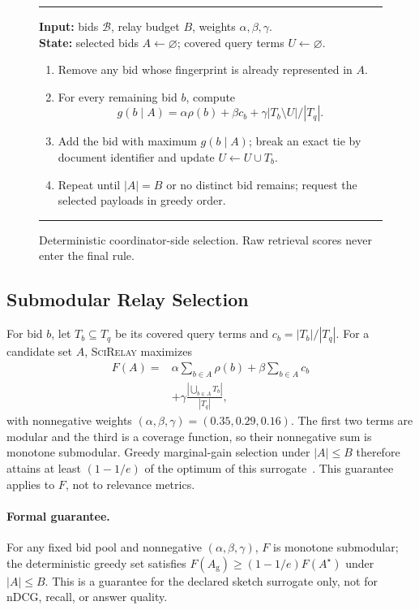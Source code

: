 \documentclass[sigconf]{acmart}
\newcommand{\method}{\textsc{SciRelay}}
\begin{document}
\begin{figure}[t]
  \small
  \hrule
  \vspace{3pt}
  \textbf{Input:} bids $\mathcal{B}$, relay budget $B$, weights $\alpha,\beta,\gamma$.\\
  \textbf{State:} selected bids $A\leftarrow\varnothing$; covered query terms $U\leftarrow\varnothing$.
  \begin{enumerate}
    \setlength{\itemsep}{0pt}
    \setlength{\parskip}{0pt}
    \item Remove any bid whose fingerprint is already represented in $A$.
    \item For every remaining bid $b$, compute
    \[
      g(b\mid A)=\alpha\rho(b)+\beta c_b+
      \gamma |T_b\setminus U|/|T_q|.
    \]
    \item Add the bid with maximum $g(b\mid A)$; break an exact tie by document identifier and update $U\leftarrow U\cup T_b$.
    \item Repeat until $|A|=B$ or no distinct bid remains; request the selected payloads in greedy order.
  \end{enumerate}
  \vspace{-2pt}
  \hrule
  \caption{Deterministic coordinator-side selection. Raw retrieval scores never enter the final rule.}
  \label{fig:protocol}
\end{figure}

\subsection{Submodular Relay Selection}

For bid $b$, let $T_b\subseteq T_q$ be its covered query terms and $c_b=|T_b|/|T_q|$. For a candidate set $A$, \method{} maximizes
\begin{align}
F(A)={}&\alpha\sum_{b\in A}\rho(b)+\beta\sum_{b\in A}c_b \\
 &+\gamma\frac{|\bigcup_{b\in A}T_b|}{|T_q|},
\end{align}
with nonnegative weights $(\alpha,\beta,\gamma)=(0.35,0.29,0.16)$. The first two terms are modular and the third is a coverage function, so their nonnegative sum is monotone submodular. Greedy marginal-gain selection under $|A|\leq B$ therefore attains at least $(1-1/e)$ of the optimum of this surrogate~\cite{nemhauser1978submodular}. This guarantee applies to $F$, not to relevance metrics.

\paragraph{Formal guarantee.}
For any fixed bid pool and nonnegative $(\alpha,\beta,\gamma)$, $F$ is monotone submodular; the deterministic greedy set satisfies $F(A_{\mathrm{g}})\geq(1-1/e)F(A^\star)$ under $|A|\leq B$. This is a guarantee for the declared sketch surrogate only, not for nDCG, recall, or answer quality.
\end{document}
